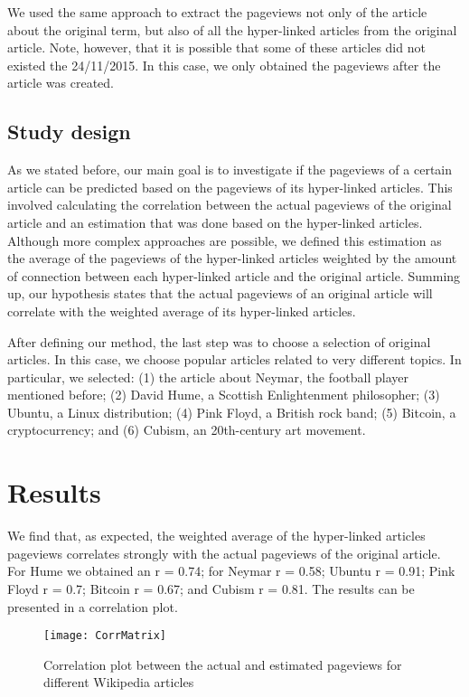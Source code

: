 \documentclass[11pt]{article}
\begin{document}
We used the same approach to extract the pageviews not only of the article about the original term, but also of all the hyper-linked articles from the original article. Note, however, that it is possible that some of these articles did not existed the 24/11/2015. In this case, we only obtained the pageviews after the article was created.


\subsection{Study design}

As we stated before, our main goal is to investigate if the pageviews of a certain article can be predicted based on the pageviews of its hyper-linked articles. This involved calculating the correlation between the actual pageviews of the original article and an estimation that was done based on the hyper-linked articles. Although more complex approaches are possible, we defined this estimation as the average of the pageviews of the hyper-linked articles weighted by the amount of connection between each hyper-linked article and the original article. Summing up, our hypothesis states that the actual pageviews of an original article will correlate with the weighted average of its hyper-linked articles.

After defining our method, the last step was to choose a selection of original articles. In this case, we choose popular articles related to very different topics. In particular, we selected: (1) the article about Neymar, the football player mentioned before; (2) David Hume, a Scottish Enlightenment philosopher; (3) Ubuntu, a Linux distribution; (4) Pink Floyd, a British rock band; (5) Bitcoin, a cryptocurrency; and (6) Cubism, an 20th-century art movement.  


\section{Results}

We find that, as expected, the weighted average of the hyper-linked articles pageviews correlates strongly with the actual pageviews of the original article. For Hume we obtained an r = 0.74; for Neymar r = 0.58; Ubuntu r = 0.91; Pink Floyd r = 0.7; Bitcoin r = 0.67; and Cubism r = 0.81. The results can be presented in a correlation plot.

\begin{figure}[H]
	\centering
	\texttt{[image: CorrMatrix]}
	\caption{Correlation plot between the actual and estimated pageviews for different Wikipedia articles}
\end{figure}
\end{document}

